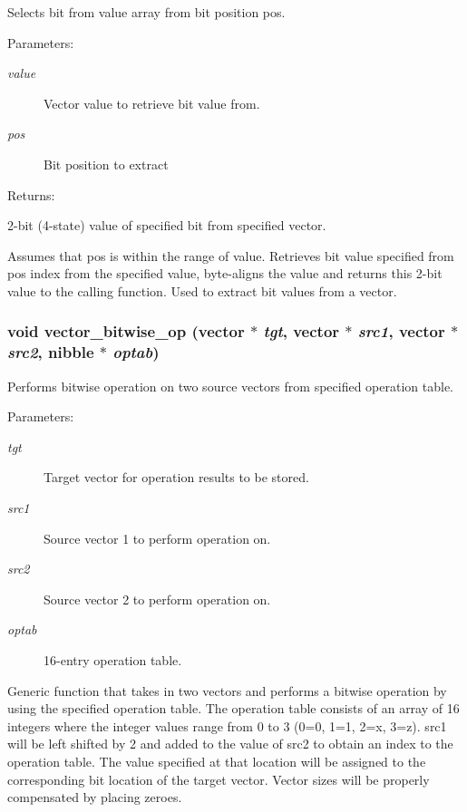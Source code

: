 Selects bit from value array from bit position pos.

\begin{Desc}
\item[Parameters: ]\par
\begin{description}
\item[{\em 
value}]Vector value to retrieve bit value from. \item[{\em 
pos}]Bit position to extract \end{description}
\end{Desc}
\begin{Desc}
\item[Returns: ]\par
2-bit (4-state) value of specified bit from specified vector.\end{Desc}
Assumes that pos is within the range of value. Retrieves bit value specified from pos index from the specified value, byte-aligns the value and returns this 2-bit value to the calling function. Used to extract bit values from a vector. 
\subsubsection{\setlength{\rightskip}{0pt plus 5cm}void vector\_\-bitwise\_\-op ({\bf vector} $\ast$ {\em tgt}, {\bf vector} $\ast$ {\em src1}, {\bf vector} $\ast$ {\em src2}, {\bf nibble} $\ast$ {\em optab})}\label{vector_8c_a34}


Performs bitwise operation on two source vectors from specified operation table.

\begin{Desc}
\item[Parameters: ]\par
\begin{description}
\item[{\em 
tgt}]Target vector for operation results to be stored. \item[{\em 
src1}]Source vector 1 to perform operation on. \item[{\em 
src2}]Source vector 2 to perform operation on. \item[{\em 
optab}]16-entry operation table.\end{description}
\end{Desc}
Generic function that takes in two vectors and performs a bitwise operation by using the specified operation table. The operation table consists of an array of 16 integers where the integer values range from 0 to 3 (0=0, 1=1, 2=x, 3=z). src1 will be left shifted by 2 and added to the value of src2 to obtain an index to the operation table. The value specified at that location will be assigned to the corresponding bit location of the target vector. Vector sizes will be properly compensated by placing zeroes. 

